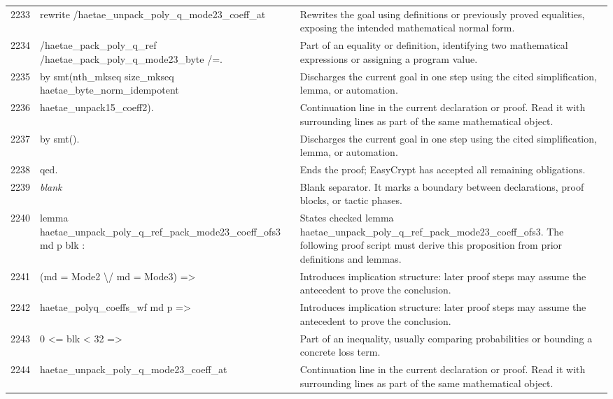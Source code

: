 \documentclass[10pt]{article}
\begin{document}
\begin{longtable}{r L{0.53\textwidth} L{0.37\textwidth}}
2233 & {\ttfamily\scriptsize   rewrite /haetae\_unpack\_poly\_q\_mode23\_coeff\_at} & Rewrites the goal using definitions or previously proved equalities, exposing the intended mathematical normal form. \\
2234 & {\ttfamily\scriptsize           /haetae\_pack\_poly\_q\_ref /haetae\_pack\_poly\_q\_mode23\_byte /=.} & Part of an equality or definition, identifying two mathematical expressions or assigning a program value. \\
2235 & {\ttfamily\scriptsize   by smt(nth\_mkseq size\_mkseq haetae\_byte\_norm\_idempotent} & Discharges the current goal in one step using the cited simplification, lemma, or automation. \\
2236 & {\ttfamily\scriptsize          haetae\_unpack15\_coeff2).} & Continuation line in the current declaration or proof.  Read it with surrounding lines as part of the same mathematical object. \\
2237 & {\ttfamily\scriptsize by smt().} & Discharges the current goal in one step using the cited simplification, lemma, or automation. \\
2238 & {\ttfamily\scriptsize qed.} & Ends the proof; EasyCrypt has accepted all remaining obligations. \\
2239 & {\ttfamily\scriptsize \emph{blank}} & Blank separator.  It marks a boundary between declarations, proof blocks, or tactic phases. \\
2240 & {\ttfamily\scriptsize lemma haetae\_unpack\_poly\_q\_ref\_pack\_mode23\_coeff\_ofs3 md p blk :} & States checked lemma haetae\_unpack\_poly\_q\_ref\_pack\_mode23\_coeff\_ofs3.  The following proof script must derive this proposition from prior definitions and lemmas. \\
2241 & {\ttfamily\scriptsize   (md = Mode2 \textbackslash{}/ md = Mode3) =>} & Introduces implication structure: later proof steps may assume the antecedent to prove the conclusion. \\
2242 & {\ttfamily\scriptsize   haetae\_polyq\_coeffs\_wf md p =>} & Introduces implication structure: later proof steps may assume the antecedent to prove the conclusion. \\
2243 & {\ttfamily\scriptsize   0 <= blk < 32 =>} & Part of an inequality, usually comparing probabilities or bounding a concrete loss term. \\
2244 & {\ttfamily\scriptsize   haetae\_unpack\_poly\_q\_mode23\_coeff\_at} & Continuation line in the current declaration or proof.  Read it with surrounding lines as part of the same mathematical object. \\

\end{longtable}
\end{document}
